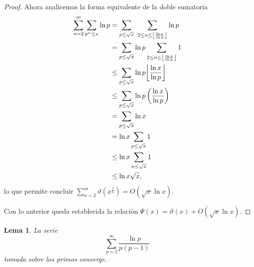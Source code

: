 \documentclass[10pt]{article}
\DeclarePairedDelimiter\floor{\lfloor}{\rfloor}
\newtheorem{lemma}[theorem]{Lema}
\theoremstyle{definition}
\theoremstyle{remark}
\begin{document}
\begin{proof}
Ahora analicemos la forma equivalente de la doble sumatoria
\begin{align}
\sum_{n = 2}^m \sum_{p^n \leq x} \ln p &= \sum_{p \leq \sqrt{x}} \, \, \sum_{2 \leq n \leq \floor*{\frac{\ln x}{\ln p}}} \ln p \\
&= \sum_{p \leq \sqrt{x}} \ln p \sum_{2 \leq n \leq \floor*{\frac{\ln x}{\ln p}}} 1 \\
&\leq \sum_{p \leq \sqrt{x}} \ln p \floor*{\frac{\ln x}{\ln p}} \\
&\leq \sum_{p \leq \sqrt{x}} \ln p \left(\frac{\ln x}{\ln p}\right) \\
&= \sum_{p \leq \sqrt{x}} \ln x \\
&= \ln x \sum_{p \leq \sqrt{x}} 1 \\
&\leq \ln x \sum_{n \leq \sqrt{x}} 1 \\
&\leq \ln x \sqrt{x}, 
\end{align}
lo que permite concluir $\sum_{n = 2}^m \vartheta(x^\frac{1}{n}) = O(\sqrt{x} \ln x)$. 

Con lo anterior queda establecida la relaci\'on $\Psi(x) = \vartheta(x) + O(\sqrt{x} \ln x)$.
\end{proof}

\begin{lemma}\label{lem19}
La serie
\[
\sum_{p = 2}^{\infty} \frac{\ln p}{p (p - 1)}
\]
tomada sobre los primos converge.
\end{lemma}
\end{document}
